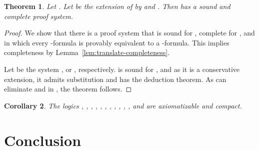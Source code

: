\documentclass[a4paper,english,fleqn,11pt,final]{scrartcl}
\theoremstyle{plain}
\newtheorem{theorem}{Theorem}[section]
\newtheorem{corollary}[theorem]{Corollary}
\theoremstyle{definition}
\begin{document}
\begin{theorem}
Let .
Let  be the extension of  by  and .
Then  has a sound and complete proof system.
\end{theorem}
\begin{proof}
We show that there is a proof system  that is sound for , complete for , and in which every -formula is provably equivalent to a -formula.
This implies completeness by Lemma~\ref{lem:translate-completeness}.

Let  be the system ,  or , respectively.
 is sound for , and as it is a conservative extension, it admits substitution and has the deduction theorem.
As  can eliminate  and  in , the theorem follows.
\end{proof}


\begin{corollary}
The logics , , , ,
, , , ,
, , ,  and  are axiomatizable and compact.
\end{corollary}




 
\section{Conclusion}




\end{document}
